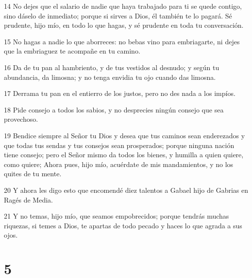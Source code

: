 \par 14 No dejes que el salario de nadie que haya trabajado para ti se quede contigo, sino dáselo de inmediato; porque si sirves a Dios, él también te lo pagará. Sé prudente, hijo mío, en todo lo que hagas, y sé prudente en toda tu conversación.
\par 15 No hagas a nadie lo que aborreces: no bebas vino para embriagarte, ni dejes que la embriaguez te acompañe en tu camino.
\par 16 Da de tu pan al hambriento, y de tus vestidos al desnudo; y según tu abundancia, da limosna; y no tenga envidia tu ojo cuando das limosna.
\par 17 Derrama tu pan en el entierro de los justos, pero no des nada a los impíos.
\par 18 Pide consejo a todos los sabios, y no desprecies ningún consejo que sea provechoso.
\par 19 Bendice siempre al Señor tu Dios y desea que tus caminos sean enderezados y que todas tus sendas y tus consejos sean prosperados; porque ninguna nación tiene consejo; pero el Señor mismo da todos los bienes, y humilla a quien quiere, como quiere; Ahora pues, hijo mío, acuérdate de mis mandamientos, y no los quites de tu mente.
\par 20 Y ahora les digo esto que encomendé diez talentos a Gabael hijo de Gabrias en Ragés de Media.
\par 21 Y no temas, hijo mío, que seamos empobrecidos; porque tendrás muchas riquezas, si temes a Dios, te apartas de todo pecado y haces lo que agrada a sus ojos.

\chapter{5}

